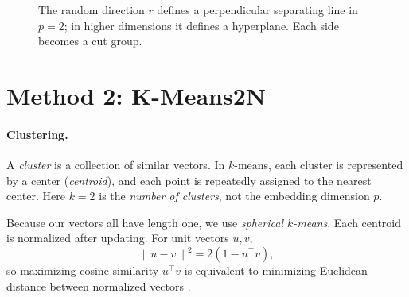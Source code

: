 \documentclass[10pt,letterpaper]{article}
\newcommand{\norm}[1]{\left\lVert#1\right\rVert}
\begin{document}
\begin{figure}[t]
\centering
{}
\caption{The random direction $r$ defines a perpendicular separating line in $p=2$; in higher dimensions it defines a hyperplane. Each side becomes a cut group.}
\end{figure}

\section{Method 2: K-Means2N}
\label{sec:2n}
\paragraph{Clustering.} A \emph{cluster} is a collection of similar vectors. In $k$-means, each cluster is represented by a center (\emph{centroid}), and each point is repeatedly assigned to the nearest center. Here $k=2$ is the \emph{number of clusters}, not the embedding dimension $p$.

Because our vectors all have length one, we use \emph{spherical $k$-means}. Each centroid is normalized after updating. For unit vectors $u,v$,
\begin{equation}\label{eq:cos-vs-distance}
 \norm{u-v}^2=2(1-u^\top v),
\end{equation}
so maximizing cosine similarity $u^\top v$ is equivalent to minimizing Euclidean distance between normalized vectors \cite{rodriguez2020}.
\end{document}
